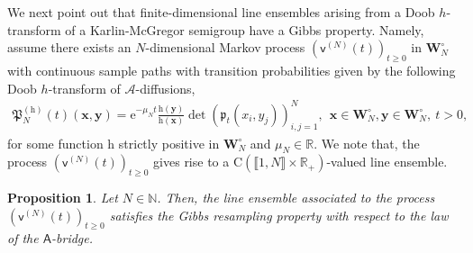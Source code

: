 \documentclass[]{article}
\newtheorem{prop}[thm]{Proposition}
\begin{document}
We next point out that finite-dimensional line ensembles arising from a Doob $h$-transform of a Karlin-McGregor semigroup \cite{KarlinMcGregor} have a Gibbs property. %
Namely, assume there exists an $N$-dimensional Markov process $(\mathsf{v}^{(N)}(t))_{t\ge 0}$ in $\mathbf{W}_{N}^\circ$ with continuous sample paths with transition probabilities given by the following Doob $h$-transform of $\mathscr{A}$-diffusions,
\begin{align}
    \label{Doob-transitioDensity}
	\mathfrak{P}_N^{(\mathrm{h})}(t)(\mathbf{x},\mathbf{y})= \mathrm{e}^{-\mu_Nt}\frac{\mathrm{h}(\mathbf{y})}{\mathrm{h}(\mathbf{x})} 
    \det\left(\mathfrak{p}_t(x_i,y_j)\right)_{i,j=1}^{N}, \  \ \mathbf{x} \in \mathbf{W}_N^{\circ}, \mathbf{y}\in\mathbf{W}_N^\circ,  \ t>0,
\end{align}
for some function $\mathrm{h}$ strictly positive in $\mathbf{W}_N^\circ$ and $\mu_N\in \mathbb{R}$. We note that, the process $(\mathsf{v}^{(N)}(t))_{t\ge 0}$ gives rise to a $\mathrm{C}(\llbracket 1, N \rrbracket \times \mathbb{R}_+)$-valued line ensemble.


\begin{prop}\label{Gibbs-finiteN}
    Let $N\in\mathbb{N}$. Then, the line ensemble associated to the process $(\mathsf{v}^{(N)}(t))_{t\ge 0}$ satisfies the Gibbs resampling property with respect to the law of the $\mathsf{A}$-bridge. 
\end{prop}
\end{document}
